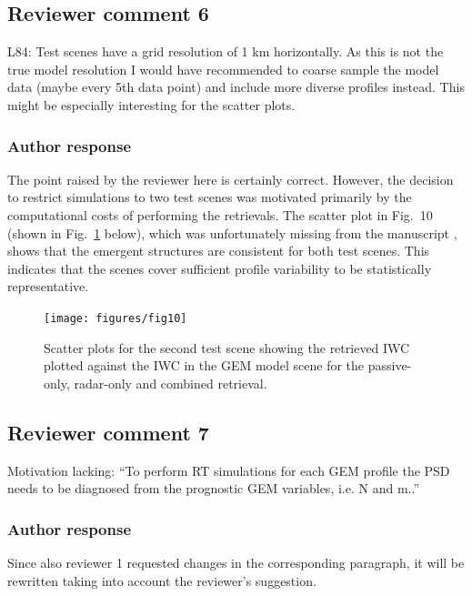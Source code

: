 \documentclass[11pt]{scrartcl}
\begin{document}
\subsection*{Reviewer comment 6}

L84: Test scenes have a grid resolution of 1 km horizontally. As this is not the
true model resolution I would have recommended to coarse sample the model data
(maybe every 5th data point) and include more diverse profiles instead. This
might be especially interesting for the scatter plots.

\subsubsection*{Author response}

The point raised by the reviewer here is certainly correct. However, the
decision to restrict simulations to two test scenes was motivated primarily by
the computational costs of performing the retrievals. The scatter plot in
Fig.~10 (shown in Fig.~\ref{fig:retrieval_sketch} below), which was
unfortunately missing from the manuscript , shows that the emergent structures
are consistent for both test scenes. This indicates that the scenes cover
sufficient profile variability to be statistically representative.

\begin{figure}
\centering
\texttt{[image: figures/fig10]}
\caption{Scatter plots for the second test scene showing the
  retrieved IWC plotted against the IWC in the GEM model scene
  for the passive-only, radar-only and combined retrieval.}
\label{fig:retrieval_sketch}
\end{figure}

\subsection*{Reviewer comment 7}

Motivation lacking: “To perform RT simulations for each GEM profile the PSD
needs to be diagnosed from the prognostic GEM variables, i.e. N and m..”

\subsubsection*{Author response}

Since also reviewer 1 requested changes in the corresponding paragraph, it will
be rewritten taking into account the reviewer's suggestion.
\end{document}
